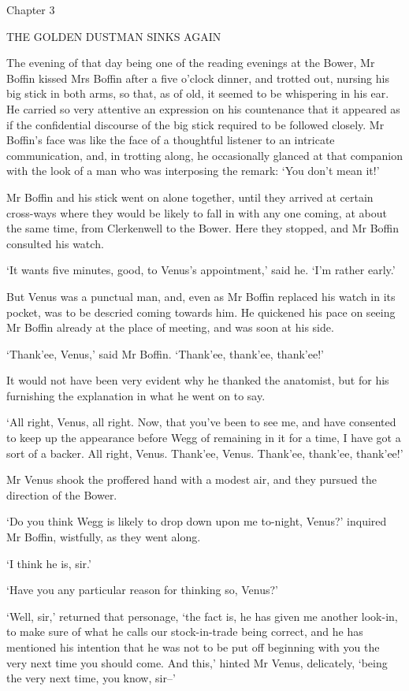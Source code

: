 Chapter 3

THE GOLDEN DUSTMAN SINKS AGAIN


The evening of that day being one of the reading evenings at the Bower,
Mr Boffin kissed Mrs Boffin after a five o’clock dinner, and trotted
out, nursing his big stick in both arms, so that, as of old, it seemed
to be whispering in his ear. He carried so very attentive an expression
on his countenance that it appeared as if the confidential discourse of
the big stick required to be followed closely. Mr Boffin’s face was like
the face of a thoughtful listener to an intricate communication, and, in
trotting along, he occasionally glanced at that companion with the look
of a man who was interposing the remark: ‘You don’t mean it!’

Mr Boffin and his stick went on alone together, until they arrived at
certain cross-ways where they would be likely to fall in with any one
coming, at about the same time, from Clerkenwell to the Bower. Here they
stopped, and Mr Boffin consulted his watch.

‘It wants five minutes, good, to Venus’s appointment,’ said he. ‘I’m
rather early.’

But Venus was a punctual man, and, even as Mr Boffin replaced his watch
in its pocket, was to be descried coming towards him. He quickened his
pace on seeing Mr Boffin already at the place of meeting, and was soon
at his side.

‘Thank’ee, Venus,’ said Mr Boffin. ‘Thank’ee, thank’ee, thank’ee!’

It would not have been very evident why he thanked the anatomist, but
for his furnishing the explanation in what he went on to say.

‘All right, Venus, all right. Now, that you’ve been to see me, and have
consented to keep up the appearance before Wegg of remaining in it for a
time, I have got a sort of a backer. All right, Venus. Thank’ee, Venus.
Thank’ee, thank’ee, thank’ee!’

Mr Venus shook the proffered hand with a modest air, and they pursued
the direction of the Bower.

‘Do you think Wegg is likely to drop down upon me to-night, Venus?’
inquired Mr Boffin, wistfully, as they went along.

‘I think he is, sir.’

‘Have you any particular reason for thinking so, Venus?’

‘Well, sir,’ returned that personage, ‘the fact is, he has given me
another look-in, to make sure of what he calls our stock-in-trade being
correct, and he has mentioned his intention that he was not to be put
off beginning with you the very next time you should come. And this,’
hinted Mr Venus, delicately, ‘being the very next time, you know, sir--’

